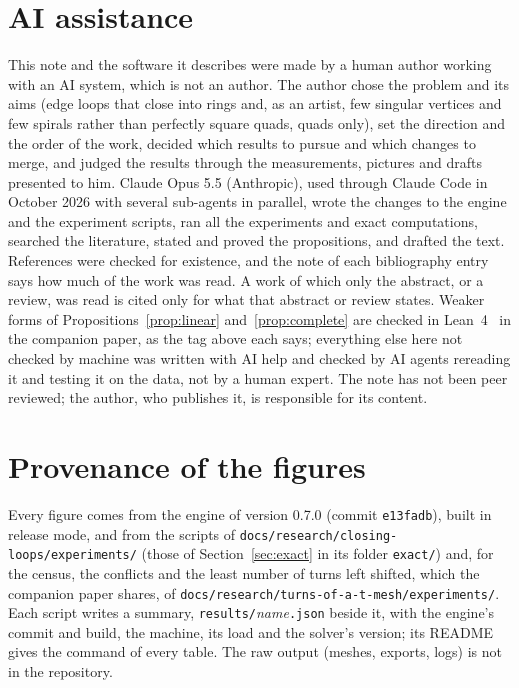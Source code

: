 \documentclass[11pt,a4paper]{article}
\begin{document}
\section*{AI assistance}
This note and the software it describes were made by a human author working
with an AI system, which is not an author. The author chose the problem and
its aims (edge loops that close into rings and, as an artist, few singular
vertices and few spirals rather than perfectly square quads, quads only), set
the direction and the order of the work, decided which results to pursue and
which changes to merge, and judged the results through the measurements,
pictures and drafts presented to him. Claude Opus 5.5 (Anthropic), used
through Claude Code in October 2026 with several sub-agents in parallel,
wrote the changes to the engine and the experiment scripts, ran all the
experiments and exact computations, searched the literature, stated and
proved the propositions, and drafted the text. References were checked for
existence, and the note of each bibliography entry says how much of the work
was read. A work of which only the abstract, or a review, was read is cited only for what that abstract or review states. Weaker forms of Propositions~\ref{prop:linear}
and~\ref{prop:complete} are checked in Lean~4~\cite{demoura2021lean4} in the
companion paper, as the tag above each says; everything else here not checked by machine was written
with AI help and checked by AI agents rereading it and testing it on the
data, not by a human expert. The note has not been peer reviewed; the author,
who publishes it, is responsible for its content.




\appendix

\section{Provenance of the figures}\label{app:provenance}

Every figure comes from the engine of version 0.7.0 (commit
\texttt{e13fadb}), built in release mode, and from the scripts of
\nolinkurl{docs/research/closing-loops/experiments/} (those of
Section~\ref{sec:exact} in its folder \nolinkurl{exact/}) and, for the
census, the conflicts and the least number of turns left shifted, which the
companion paper shares, of \nolinkurl{docs/research/turns-of-a-t-mesh/experiments/}.
Each script writes a summary, \texttt{results/}\textit{name}\texttt{.json}
beside it, with the engine's commit and build, the machine, its load and the
solver's version; its README gives the command of every table. The raw
output (meshes, exports, logs) is not in the repository.
\end{document}
